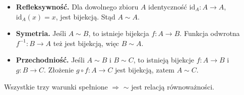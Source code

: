 \documentclass{article}
\begin{document}
\begin{itemize}
\item \textbf{Refleksywność.} Dla dowolnego zbioru \(A\) identyczność \(\mathrm{id}_A:A\to A\), \(\mathrm{id}_A(x)=x\), jest bijekcją. Stąd \(A\sim A\).

\item \textbf{Symetria.} Jeśli \(A\sim B\), to istnieje bijekcja \(f:A\to B\). Funkcja odwrotna \(f^{-1}:B\to A\) też jest bijekcją, więc \(B\sim A\).

\item \textbf{Przechodniość.} Jeśli \(A\sim B\) i \(B\sim C\), to istnieją bijekcje \(f:A\to B\) i \(g:B\to C\). Złożenie \(g\circ f:A\to C\) jest bijekcją, zatem \(A\sim C\).
\end{itemize}

Wszystkie trzy warunki spełnione $\Rightarrow$ \(\sim\) jest relacją równoważności.
\end{document}
